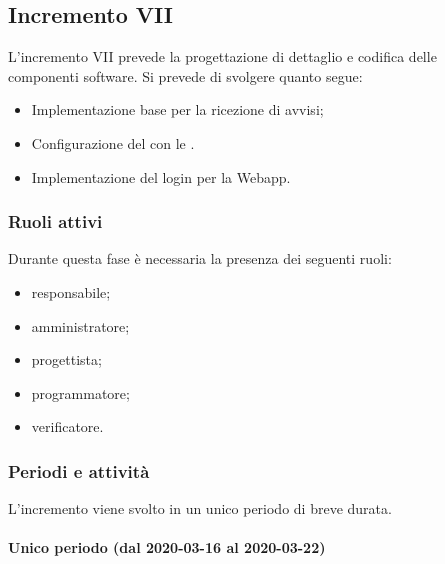 
		\subsection{Incremento VII}
			
			L'incremento VII prevede la progettazione di dettaglio e codifica delle componenti software. Si prevede di svolgere quanto segue:
			\begin{itemize}
				\item Implementazione base  per la ricezione di avvisi;
				\item Configurazione del  con le . 
				\item Implementazione del login per la Webapp.
			\end{itemize}
			
			\subsubsection{Ruoli attivi}
			
				Durante questa fase è necessaria la presenza dei seguenti ruoli:
				\begin{itemize}
					\item responsabile;
					\item amministratore;
					\item progettista;
					\item programmatore;
					\item verificatore.
				\end{itemize}
			
			\subsubsection{Periodi e attività}
			
				L'incremento viene svolto in un unico periodo di breve durata.
				
				\paragraph{Unico periodo (dal 2020-03-16 al 2020-03-22)}
				

